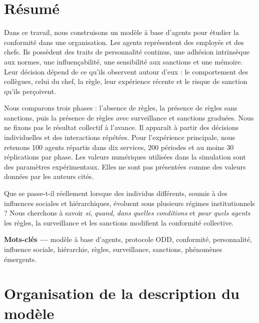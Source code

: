 \documentclass[11pt,a4paper]{article}
\begin{document}
\hypersetup{pageanchor=true}

\section*{Résumé}

Dans ce travail, nous construisons un modèle à base d’agents pour étudier la
conformité dans une organisation. Les agents représentent des employés et des
chefs. Ils possèdent des traits de personnalité continus, une adhésion
intrinsèque aux normes, une influençabilité, une sensibilité aux sanctions et
une mémoire. Leur décision dépend de ce qu’ils observent autour d’eux : le
comportement des collègues, celui du chef, la règle, leur expérience récente et
le risque de sanction qu’ils perçoivent.

Nous comparons trois phases : l’absence de règles, la présence de règles sans
sanctions, puis la présence de règles avec surveillance et sanctions graduées.
Nous ne fixons pas le résultat collectif à l’avance. Il apparaît à partir des
décisions individuelles et des interactions répétées. Pour l’expérience
principale, nous retenons 100 agents répartis dans dix services, 200 périodes et
au moins 30 réplications par phase. Les valeurs numériques utilisées dans la
simulation sont des paramètres expérimentaux. Elles ne sont pas présentées
comme des valeurs données par les auteurs cités.

\begin{keybox}[title=Question scientifique]
Que se passe-t-il réellement lorsque des individus différents, soumis à des
influences sociales et hiérarchiques, évoluent sous plusieurs régimes
institutionnels ? Nous cherchons à savoir \emph{si}, \emph{quand}, \emph{dans
quelles conditions} et \emph{pour quels agents} les règles, la surveillance et
les sanctions modifient la conformité collective.
\end{keybox}

\textbf{Mots-clés —} modèle à base d’agents, protocole ODD, conformité,
personnalité, influence sociale, hiérarchie, règles, surveillance, sanctions,
phénomènes émergents.

\newpage
\tableofcontents
\newpage
\listoftables
{}

\newpage
{}

\section{Organisation de la description du modèle}
\end{document}
